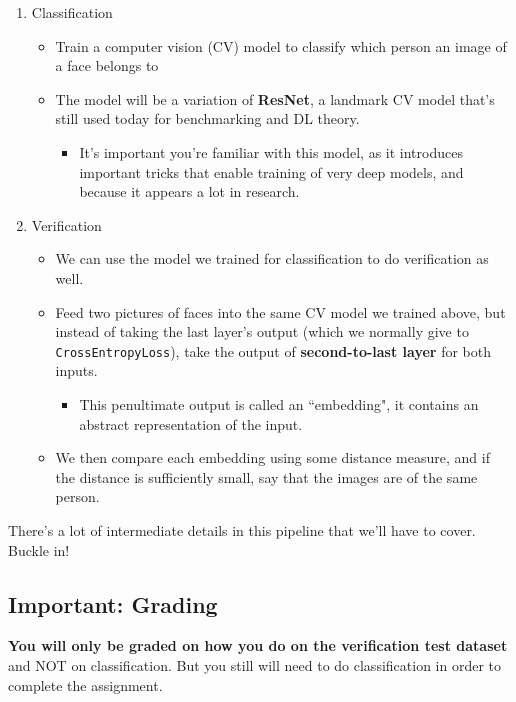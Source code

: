 \documentclass{article}
\newcommand{\ttt}[1]{\texttt{#1}}
\begin{document}
\begin{enumerate}
    \item Classification
    \begin{itemize}
        \item Train a computer vision (CV) model to classify which person an image of a face belongs to
        \item The model will be a variation of \textbf{ResNet}, a landmark CV model that's still used today for benchmarking and DL theory.
            \begin{itemize}
                \item It's important you're familiar with this model, as it introduces important tricks that enable training of very deep models, and because it appears a lot in research.
            \end{itemize}
    \end{itemize}    
    \item Verification
    \begin{itemize}
        \item We can use the model we trained for classification to do verification as well. 
        \item Feed two pictures of faces into the same CV model we trained above, but instead of taking the last layer's output (which we normally give to \ttt{CrossEntropyLoss}), take the output of \textbf{second-to-last layer} for both inputs.
        \begin{itemize}
            \item This penultimate output is called an ``embedding", it contains an abstract representation of the input.
        \end{itemize}
        \item We then compare each embedding using some distance measure, and if the distance is sufficiently small, say that the images are of the same person.
    \end{itemize}
\end{enumerate}


There's a lot of intermediate details in this pipeline that we'll have to cover. Buckle in!

\subsection{Important: Grading}
\textbf{You will only be graded on how you do on the verification test dataset} and NOT on classification. But you still will need to do classification in order to complete the assignment. 
\end{document}
